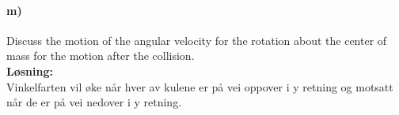 \documentclass[11pt, A4paper,norsk]{article}
\begin{document}
		\paragraph{m)}
			\begin{flushleft}
Discuss the motion of the angular velocity for the rotation about the center of mass for the motion after the collision. \\
\vspace{1mm}
\textbf{Løsning:} \\
\vspace{1mm}
Vinkelfarten vil øke når hver av kulene er på vei oppover i y retning og motsatt når de er på vei nedover i y retning.
			\end{flushleft}
\end{document}
